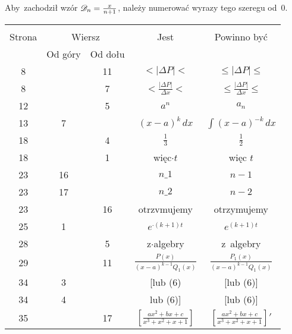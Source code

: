 \documentclass[a4paper,11pt]{article}
\begin{document}
\start {} Aby~zachodził wzór
$\mathcal{D}_{ n } = \tfrac{ x }{ n + 1 }$, należy numerować wyrazy tego
szeregu od~0.

\vspace{\spaceFour}







\begin{center}

  \begin{tabular}{|c|c|c|c|c|}
    \hline
    & \multicolumn{2}{c|}{} & & \\
    Strona & \multicolumn{2}{c|}{Wiersz} & Jest
                              & Powinno być \\ \cline{2-3}
    & Od góry & Od dołu & & \\
    \hline
    8   & & 11 & $< | \Delta P | <$ & $\leq | \Delta P | \leq$ \\[0.2em]
    8   & &  7 & $< \frac{ | \Delta P | }{ \Delta x } <$
           & $\leq \frac{ | \Delta P | }{ \Delta x } \leq$ \\[0.2em]
    12  & &  5 & $a^{ n }$ & $a_{ n }$ \\
    13  &  7 & & $( x - a )^{ k } \, dx$ & $\int ( x - a )^{ -k } \, dx$ \\
    18  & &  4 & $\frac{ 1 }{ 3 }$ & $\frac{ 1 }{ 2 }$ \\
    18  & &  1 & więc$\cdot t$ & więc $t$ \\
    23  & 16 & & $n \_ 1$ & $n - 1$ \\
    23  & 17 & & $n \_ 2$ & $n - 2$ \\
    23  & & 16 & otrzvmujemy & otrzymujemy \\
    25  &  1 & & $e^{ \cdot ( k + 1 ) t}$ & $e^{ ( k + 1 ) t}$ \\
    28  & &  5 & z$\cdot$algebry & z~algebry \\[0.2em]
    29  & & 11 & $\frac{ P( x ) }{ ( x - a )^{ k - 1 } Q_{ 1 }( x ) }$
           & $\frac{ P_{ 1 }( x ) }{ ( x - a )^{ k - 1 } Q_{ 1 }( x ) }$
    \\[0.3em]
    34  &  3 & & [lub (6) & [lub (6)] \\
    34  &  4 & & lub (6)] & [lub (6)] \\[0.2em]
    35  & & 17 & $\left[ \frac{ a x^{ 2 } + b x + c }
                 { x^{ 3 } + x^{ 2 } + x + 1 } \right]$
           & $\left[ \frac{ a x^{ 2 } + b x + c }
             { x^{ 3 } + x^{ 2 } + x + 1 } \right]'$ \\[0.4em]

\end{tabular}
\end{center}
\end{document}
